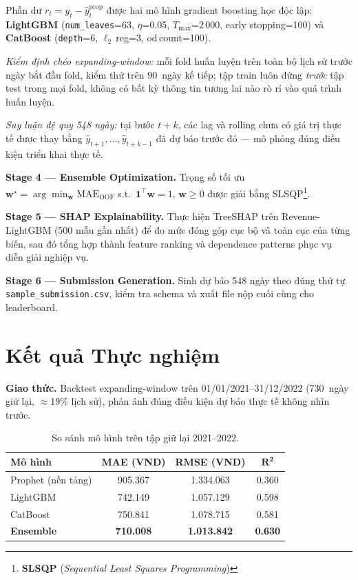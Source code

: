 \documentclass[10pt,twocolumn]{article}
\begin{document}
Phần dư $r_t = y_t - \hat{y}^{\text{prop}}_t$ được hai mô hình
gradient boosting học độc lập: \textbf{LightGBM}
(\texttt{num\_leaves}=63, $\eta$=0.05, $T_{\max}$=2\,000,
early stopping=100) và \textbf{CatBoost}
(\texttt{depth}=6, $\ell_2$\,reg=3, od\,count=100).

\emph{Kiểm định chéo expanding-window:} mỗi fold huấn luyện trên toàn
bộ lịch sử trước ngày bắt đầu fold, kiểm thử trên 90~ngày kế tiếp;
tập train luôn đứng \emph{trước} tập test trong mọi fold, không có
bất kỳ thông tin tương lai nào rò rỉ vào quá trình huấn luyện.

\emph{Suy luận đệ quy 548 ngày:} tại bước $t+k$, các lag và rolling
chưa có giá trị thực tế được thay bằng $\hat{y}_{t+1},\ldots,\hat{y}_{t+k-1}$
đã dự báo trước đó --- mô phỏng đúng điều kiện triển khai thực tế.

\noindent\textbf{Stage 4 --- Ensemble Optimization.}
Trọng số tối ưu $\mathbf{w}^\star=\arg\min_\mathbf{w}\mathrm{MAE}_\text{OOF}$
s.t.\ $\mathbf{1}^\top\mathbf{w}=1,\,\mathbf{w}\!\geq\!0$ được giải
bằng SLSQP\footnote{\textbf{SLSQP} (\textit{Sequential Least Squares Programming})}.

\noindent\textbf{Stage 5 --- SHAP Explainability.}
Thực hiện TreeSHAP trên Revenue-LightGBM (500 mẫu gần nhất) để đo
mức đóng góp cục bộ và toàn cục của từng biến, sau đó tổng hợp thành
feature ranking và dependence patterns phục vụ diễn giải nghiệp vụ.

\noindent\textbf{Stage 6 --- Submission Generation.}
Sinh dự báo 548 ngày theo đúng thứ tự \texttt{sample\_submission.csv},
kiểm tra schema và xuất file nộp cuối cùng cho leaderboard.

\section{Kết quả Thực nghiệm}

\textbf{Giao thức.} Backtest expanding-window trên
01/01/2021--31/12/2022 (730~ngày giữ lại, $\approx$19\% lịch sử),
phản ánh đúng điều kiện dự báo thực tế không nhìn trước.

\begin{table}[h]
\centering
\caption{So sánh mô hình trên tập giữ lại 2021--2022.}
\label{tab:results}
\vspace{-1pt}
\scriptsize
\setlength{\tabcolsep}{2.8pt}
\begin{tabular}{lccc}
\hline
\textbf{Mô hình} & \textbf{MAE (VND)} & \textbf{RMSE (VND)} & $\boldsymbol{R^2}$ \\
\hline
Prophet (nền tảng) & 905.367   & 1.334.063 & 0.360 \\
LightGBM           & 742.149   & 1.057.129 & 0.598 \\
CatBoost           & 750.841   & 1.078.715 & 0.581 \\
\textbf{Ensemble}  & \textbf{710.008} & \textbf{1.013.842} & \textbf{0.630} \\
\hline
\end{tabular}
\end{table}
\end{document}
